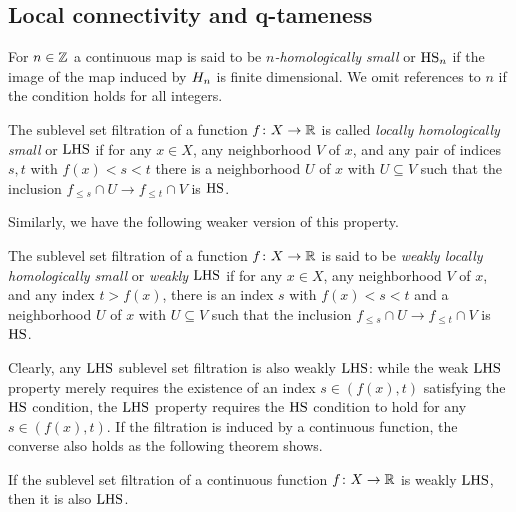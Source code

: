 \subsection{Local connectivity and q-tameness}

\begin{defi}
	For $n \in \mathbb{Z}$ a continuous map is said to be \emph{$n$-homologically small} or $\mathrm{HS}_n$ if the image of the map induced by $H_{n}$ is finite dimensional.
	We omit references to $n$ if the condition holds for all integers.
\end{defi}

\begin{defi}
	The sublevel set filtration of a function $f \colon X \to \mathbb{R}$ is called \emph{locally homologically small} or \emph{$\mathrm{LHS}$} if for any $x \in X$, any neighborhood $V$ of $x$, and any pair of indices $s,t$ with $f(x) < s < t$ there is a neighborhood $U$ of $x$ with $U \subseteq V$ such that the inclusion $f_{\leq s} \cap U \to f_{\leq t} \cap V$ is $\mathrm{HS}$.
\end{defi}

Similarly, we have the following weaker version of this property.

\begin{defi}
	The sublevel set filtration of a function $f \colon X \to \mathbb{R}$ is said to be \emph{weakly locally homologically small} or \emph{weakly $\mathrm{LHS}$} if for any $x \in X$, any neighborhood $V$ of $x$, and any index $t > f(x)$, there is an index $s$ with $f(x) < s < t$ and a neighborhood $U$ of $x$ with $U \subseteq V$ such that the inclusion $f_{\leq s} \cap U \to f_{\leq t} \cap V$ is $\mathrm{HS}$.
\end{defi}

Clearly, any $\mathrm{LHS}$ sublevel set filtration is also weakly $\mathrm{LHS}$:
while the weak $\mathrm{LHS}$ property merely requires the existence of an index $s \in (f(x),t)$ satisfying the $\mathrm{HS}$ condition, the $\mathrm{LHS}$ property requires the $\mathrm{HS}$ condition to hold for any $s \in (f(x),t)$.
If the filtration is induced by a continuous function, the converse also holds as the following theorem shows.

\begin{thm} \label{t:weak hlc to hlc}
	If the sublevel set filtration of a continuous function $f \colon X \to \mathbb{R}$ is weakly $\mathrm{LHS}$, then it is also $\mathrm{LHS}$.
\end{thm}

